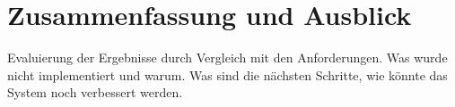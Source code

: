 \documentclass[BMR,Bachelor,ngerman]{twbook}%
\begin{document}
\chapter{Zusammenfassung und Ausblick}
Evaluierung der Ergebnisse durch Vergleich mit den Anforderungen. Was wurde nicht implementiert und warum. Was sind die nächsten Schritte, wie könnte das System noch verbessert werden.
%

\end{document}
